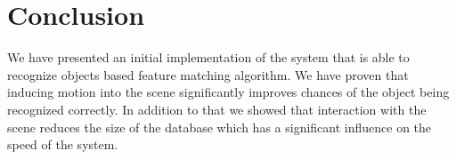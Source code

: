 \section{Conclusion}
We have presented an initial implementation of the system that is able to recognize objects based feature matching algorithm. We have proven that inducing motion into the scene significantly improves chances of the object being recognized correctly. In addition to that we showed that interaction with the scene reduces the size of the database which has a significant influence on the speed of the system.  
